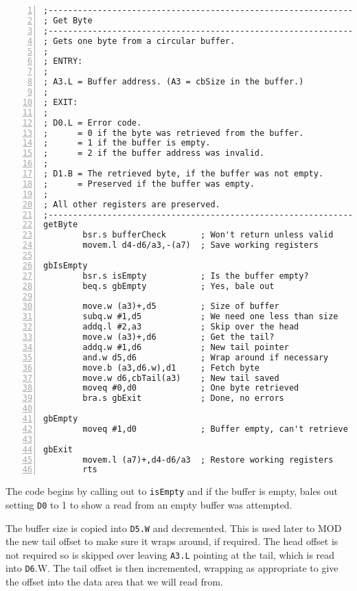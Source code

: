 \begin{lstlisting}[caption={Reading data from a buffer},label={lis:Reading-data-from-a-buffer},numbers=left,showstringspaces=false,tabsize=4]
;--------------------------------------------------------------
; Get Byte
;--------------------------------------------------------------
; Gets one byte from a circular buffer.
; 
; ENTRY:
;
; A3.L = Buffer address. (A3 = cbSize in the buffer.)
;
; EXIT:
;
; D0.L = Error code.
;      = 0 if the byte was retrieved from the buffer.
;      = 1 if the buffer is empty.
;      = 2 if the buffer address was invalid.
;
; D1.B = The retrieved byte, if the buffer was not empty.
;      = Preserved if the buffer was empty.
;
; All other registers are preserved.
;--------------------------------------------------------------
getByte
        bsr.s bufferCheck       ; Won't return unless valid
        movem.l d4-d6/a3,-(a7)  ; Save working registers

gbIsEmpty
        bsr.s isEmpty           ; Is the buffer empty?
        beq.s gbEmpty           ; Yes, bale out

        move.w (a3)+,d5         ; Size of buffer
        subq.w #1,d5            ; We need one less than size
        addq.l #2,a3            ; Skip over the head
        move.w (a3)+,d6         ; Get the tail?
        addq.w #1,d6            ; New tail pointer
        and.w d5,d6             ; Wrap around if necessary
        move.b (a3,d6.w),d1     ; Fetch byte
        move.w d6,cbTail(a3)    ; New tail saved
        moveq #0,d0             ; One byte retrieved
        bra.s gbExit            ; Done, no errors

gbEmpty
        moveq #1,d0             ; Buffer empty, can't retrieve

gbExit
        movem.l (a7)+,d4-d6/a3  ; Restore working registers
        rts

\end{lstlisting}

The code begins by calling out to \texttt{isEmpty} and if the buffer
is empty, bales out setting \texttt{D0} to 1 to show a read from an
empty buffer was attempted.

The buffer size is copied into \texttt{D5.W} and decremented. This
is used later to MOD the new tail offset to make sure it wraps around,
if required. The head offset is not required so is skipped over leaving
\texttt{A3.L} pointing at the tail, which is read into \texttt{D6}.W.
The tail offset is then incremented, wrapping as appropriate to give
the offset into the data area that we will read from. 

